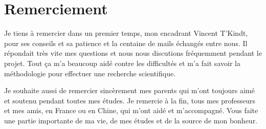 \chapter*{Remerciement}
Je tiens à remercier dans un premier temps, mon encadrant Vincent T'Kindt, pour ses conseils et sa patience et la centaine de mails échangés entre nous. Il répondait très vite mes questions et nous nous discutions fréquemment pendant le projet. Tout ça m'a beaucoup aidé contre les difficultés et m'a fait savoir la méthodologie pour effectuer une recherche scientifique.

Je souhaite aussi de remercier sincèrement mes parents qui m'ont toujours aimé et soutenu pendant toutes mes études. Je remercie à la fin, tous mes professeurs et mes amis, en France ou en Chine, qui m'ont aidé et m'accompagné. Vous faite une partie importante de ma vie, de mes études et de la source de mon bonheur.